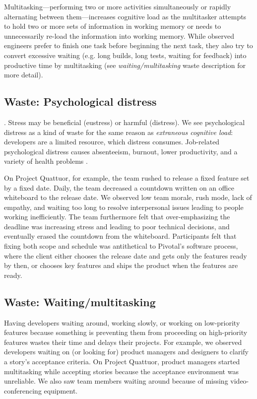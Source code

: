 Multitasking---performing two or more activities simultaneously or rapidly alternating between them---increases cognitive load as the multitasker attempts to hold two or more sets of information in working memory or needs to unnecessarily re-load the information into working memory. While observed engineers prefer to finish one task before beginning the next task, they also try to convert excessive waiting (e.g. long builds, long tests, waiting for feedback) into productive time by multitasking (see \textit{waiting/multitasking} waste description for more detail).

\subsection{Waste: Psychological distress}
 \cite{Selye1976}. Stress may be beneficial (eustress) or harmful (distress). We see psychological distress as a kind of waste for the same reason as \textit{extraneous cognitive load}: developers are a limited resource, which distress consumes. Job-related psychological distress causes absenteeism, burnout, lower productivity, and a variety of health problems \cite{Westman2001}.   
 
On Project Quattuor, for example, the team rushed to release a fixed feature set by a fixed date. Daily, the team decreased a countdown written on an office whiteboard to the release date. We observed low team morale, rush mode, lack of empathy, and waiting too long to resolve interpersonal issues leading to people working inefficiently. The team furthermore felt that over-emphasizing the deadline was increasing stress and leading to poor technical decisions, and eventually erased the countdown from the whiteboard. Participants felt that fixing both scope and schedule was antithetical to Pivotal's software process, where the client either chooses the release date and gets only the features ready by then, or chooses key features and ships the product when the features are ready. 

\subsection{Waste: Waiting/multitasking}
Having developers waiting around, working slowly, or working on low-priority features because something is preventing them from proceeding on high-priority features wastes their time and delays their projects. For example, we observed developers waiting on (or looking for) product managers and designers to clarify a story's acceptance criteria. On Project Quattuor, product managers started multitasking while accepting stories because the acceptance environment was unreliable. We also saw team members waiting around because of missing video-conferencing equipment. 

